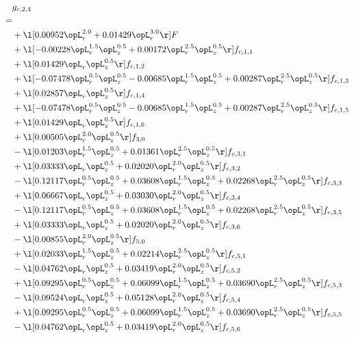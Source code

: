 \begin{alignat}{2} 
\label{eq:g_24_0} 
& g_{c,2,4} \nonumber \\ 
 = \\ 
& + \l[  0.00952 \opL_r^{2.0} +  0.01429 \opL_r^{3.0}  \r] F \nonumber \\ 
& + \l[  -0.00228 \opL_r^{1.5} \opL_z^{0.5} +  0.00172 \opL_r^{2.5} \opL_z^{0.5}  \r] f_{c,1,1} \nonumber \\ 
& + \l[  0.01429 \opL_r \opL_z^{0.5}  \r] f_{c,1,2} \nonumber \\ 
& + \l[  -0.07478 \opL_r^{0.5} \opL_z^{0.5}   -0.00685 \opL_r^{1.5} \opL_z^{0.5} +  0.00287 \opL_r^{2.5} \opL_z^{0.5}  \r] f_{c,1,3} \nonumber \\ 
& + \l[  0.02857 \opL_r \opL_z^{0.5}  \r] f_{c,1,4} \nonumber \\ 
& + \l[  -0.07478 \opL_r^{0.5} \opL_z^{0.5}   -0.00685 \opL_r^{1.5} \opL_z^{0.5} +  0.00287 \opL_r^{2.5} \opL_z^{0.5}  \r] f_{c,1,5} \nonumber \\ 
& + \l[  0.01429 \opL_r \opL_z^{0.5}  \r] f_{c,1,6} \nonumber \\ 
& + \l[  0.00505 \opL_r^{2.0} \opL_z^{0.5}  \r] f_{3,0} \nonumber \\ 
& - \l[  0.01203 \opL_r^{1.5} \opL_z^{0.5} +  0.01361 \opL_r^{2.5} \opL_z^{0.5}  \r] f_{c,3,1} \nonumber \\ 
& + \l[  0.03333 \opL_r \opL_z^{0.5} +  0.02020 \opL_r^{2.0} \opL_z^{0.5}  \r] f_{c,3,2} \nonumber \\ 
& - \l[  0.12117 \opL_r^{0.5} \opL_z^{0.5} +  0.03608 \opL_r^{1.5} \opL_z^{0.5} +  0.02268 \opL_r^{2.5} \opL_z^{0.5}  \r] f_{c,3,3} \nonumber \\ 
& + \l[  0.06667 \opL_r \opL_z^{0.5} +  0.03030 \opL_r^{2.0} \opL_z^{0.5}  \r] f_{c,3,4} \nonumber \\ 
& - \l[  0.12117 \opL_r^{0.5} \opL_z^{0.5} +  0.03608 \opL_r^{1.5} \opL_z^{0.5} +  0.02268 \opL_r^{2.5} \opL_z^{0.5}  \r] f_{c,3,5} \nonumber \\ 
& + \l[  0.03333 \opL_r \opL_z^{0.5} +  0.02020 \opL_r^{2.0} \opL_z^{0.5}  \r] f_{c,3,6} \nonumber \\ 
& - \l[  0.00855 \opL_r^{2.0} \opL_z^{0.5}  \r] f_{5,0} \nonumber \\ 
& + \l[  0.02033 \opL_r^{1.5} \opL_z^{0.5} +  0.02214 \opL_r^{2.5} \opL_z^{0.5}  \r] f_{c,5,1} \nonumber \\ 
& - \l[  0.04762 \opL_r \opL_z^{0.5} +  0.03419 \opL_r^{2.0} \opL_z^{0.5}  \r] f_{c,5,2} \nonumber \\ 
& + \l[  0.09295 \opL_r^{0.5} \opL_z^{0.5} +  0.06099 \opL_r^{1.5} \opL_z^{0.5} +  0.03690 \opL_r^{2.5} \opL_z^{0.5}  \r] f_{c,5,3} \nonumber \\ 
& - \l[  0.09524 \opL_r \opL_z^{0.5} +  0.05128 \opL_r^{2.0} \opL_z^{0.5}  \r] f_{c,5,4} \nonumber \\ 
& + \l[  0.09295 \opL_r^{0.5} \opL_z^{0.5} +  0.06099 \opL_r^{1.5} \opL_z^{0.5} +  0.03690 \opL_r^{2.5} \opL_z^{0.5}  \r] f_{c,5,5} \nonumber \\ 
& - \l[  0.04762 \opL_r \opL_z^{0.5} +  0.03419 \opL_r^{2.0} \opL_z^{0.5}  \r] f_{c,5,6} \nonumber \\ 
\end{alignat} 


